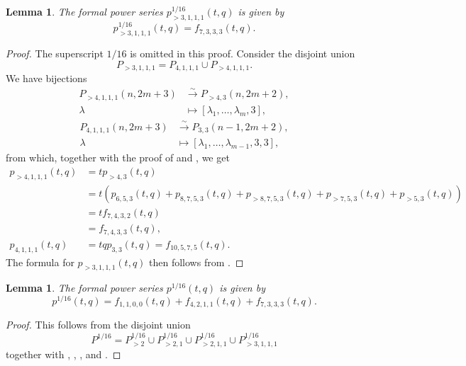 \documentclass[a4paper, 12pt, reqno]{amsart}
\newtheorem{lemma}[theorem]{Lemma}
\theoremstyle{remark}
\numberwithin{equation}{subsection}
\begin{document}
\begin{lemma}
  \label{lmm:34}
  The formal power series $p^{1/16}_{>3, 1, 1, 1}(t, q)$ is given by
  \begin{equation*}
    p^{1/16}_{>3, 1, 1, 1}(t, q) = f_{7, 3, 3, 3}(t, q).
  \end{equation*}
\end{lemma}

\begin{proof}
  The superscript $1/16$ is omitted in this proof.
  Consider the disjoint union
  \begin{equation*}
    P_{>3, 1, 1, 1} = P_{4, 1, 1, 1} \cup P_{>4, 1, 1, 1}.
  \end{equation*}
  We have bijections
  \begin{align*}
    P_{>4, 1, 1, 1}(n, 2m + 3) &\xrightarrow{\sim} P_{>4, 3}(n, 2m + 2), \\
    \lambda &\mapsto [\lambda_1, \dots, \lambda_m, 3],
  \end{align*}
  \begin{align*}
    P_{4, 1, 1, 1}(n, 2m + 3) &\xrightarrow{\sim} P_{3, 3}(n - 1, 2m + 2), \\
    \lambda &\mapsto [\lambda_1, \dots, \lambda_{m - 1}, 3, 3],
  \end{align*}
  from which, together with the proof of  and , we get
  \begin{align*}
    p_{>4, 1, 1, 1}(t, q) &= tp_{>4, 3}(t, q) \\
    &= t(p_{6, 5, 3}(t, q) + p_{8, 7, 5, 3}(t, q) + p_{>8, 7, 5, 3}(t, q) + p_{>7, 5, 3}(t, q) + p_{>5, 3}(t, q)) \\
    &= tf_{7, 4, 3, 2}(t, q) \\
    &= f_{7, 4, 3, 3}(t, q), \\
    p_{4, 1, 1, 1}(t, q) &= tqp_{3, 3}(t, q) = f_{10, 5, 7, 5}(t, q).
  \end{align*}
  The formula for $p_{>3, 1, 1, 1}(t, q)$ then follows from .
\end{proof}

\begin{lemma}
  \label{lmm:35}
  The formal power series $p^{1/16}(t, q)$ is given by
  \begin{equation*}
    p^{1/16}(t, q) = f_{1, 1, 0, 0}(t, q) + f_{4, 2, 1, 1}(t, q) + f_{7, 3, 3, 3}(t, q).
  \end{equation*}
\end{lemma}

\begin{proof}
  This follows from the disjoint union
  \begin{equation*}
    P^{1/16} = P^{1/16}_{>2} \cup P^{1/16}_{>2, 1} \cup P^{1/16}_{>2, 1, 1} \cup P^{1/16}_{>3, 1, 1, 1}
  \end{equation*}
  together with , , ,  and .
\end{proof}
\end{document}
